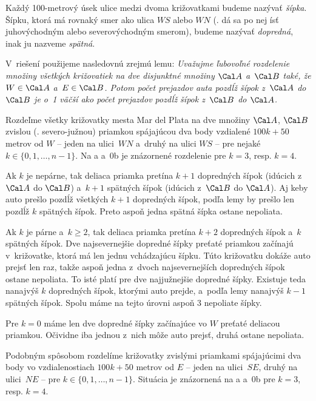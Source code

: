{%
Každý 100-metrový úsek ulice medzi dvoma križovatkami budeme nazývať {\it šípka}. Šípku, ktorá má rovnaký smer ako ulica $WS$ alebo $WN$ (\tj. dá sa po nej ísť juhovýchodným alebo severovýchodným smerom), budeme nazývať {\it dopredná\/}, inak ju nazveme {\it spätná\/}.

V~riešení použijeme nasledovnú zrejmú lemu: {\sl Uvažujme ľubovoľné rozdelenie množiny všetkých križovatiek na dve disjunktné množiny $\Cal A$ a~$\Cal B$ také, že $W\in\Cal A$ a~$E\in\Cal B$. Potom počet prejazdov auta pozdĺž šípok z~$\Cal A$ do $\Cal B$ je o~1 väčší ako počet prejazdov pozdĺž šípok z~$\Cal B$ do $\Cal A$.}

Rozdeľme všetky križovatky mesta Mar del Plata na dve množiny $\Cal A$, $\Cal B$ zvislou (\tj. severo-južnou) priamkou spájajúcou dva body vzdialené $100k+50$ metrov od $W$ -- jeden na ulici~$WN$ a~druhý na ulici $WS$ -- pre nejaké $k\in\{0,1,\dots,n-1\}$. Na \obr{}a a~\obrrnum0b je znázornené rozdelenie pre $k=3$, resp. $k=4$.
%

Ak $k$ je nepárne, tak deliaca priamka pretína $k+1$ dopredných šípok (idúcich z~$\Cal A$ do $\Cal B$) a~$k+1$ spätných šípok (idúcich z~$\Cal B$ do $\Cal A$). Aj keby auto prešlo pozdĺž všetkých $k+1$ dopredných šípok, podľa lemy by prešlo len pozdĺž $k$ spätných šípok. Preto aspoň jedna spätná šípka ostane nepoliata.

Ak $k$ je párne a~$k\ge2$, tak deliaca priamka pretína $k+2$ dopredných šípok a~$k$ spätných šípok. Dve najsevernejšie dopredné šípky preťaté priamkou začínajú v~križovatke, ktorá má len jednu vchádzajúcu šípku. Túto križovatku dokáže auto prejsť len raz, takže aspoň jedna z~dvoch najsevernejších dopredných šípok ostane nepoliata. To isté platí pre dve najjužnejšie dopredné šípky. Existuje teda nanajvýš $k$ dopredných šípok, ktorými auto prejde, a~podľa lemy nanajvýš $k-1$ spätných šípok. Spolu máme na tejto úrovni aspoň 3 nepoliate šípky.

Pre $k=0$ máme len dve dopredné šípky začínajúce vo $W$ preťaté deliacou priamkou. Očividne iba jednou z~nich môže auto prejsť, druhá ostane nepoliata.

\smallskip
Podobným spôsobom rozdelíme križovatky zvislými priamkami spájajúcimi dva body vo vzdialenostiach $100k+50$ metrov od $E$ -- jeden na ulici~$SE$, druhý na ulici~$NE$ -- pre $k\in\{0,1,\dots,n-1\}$. Situácia je znázornená na \obr{}a a~\obrrnum0b pre $k=3$, resp. $k=4$.
%

}
